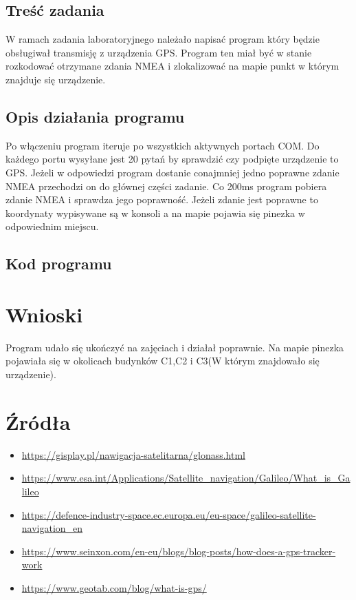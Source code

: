 \documentclass{article}
\begin{document}
    \subsection{Treść zadania}
    W ramach zadania laboratoryjnego należało napisać program który będzie obsługiwał transmisję z urządzenia GPS.
    Program ten miał być w stanie rozkodować otrzymane zdania NMEA i zlokalizować na mapie punkt w którym znajduje 
    się urządzenie.
    \subsection{Opis działania programu}
    Po włączeniu program iteruje po wszystkich aktywnych portach COM. Do każdego portu wysyłane jest 20 pytań by 
    sprawdzić czy podpięte urządzenie to GPS. Jeżeli w odpowiedzi program dostanie conajmniej jedno poprawne 
    zdanie NMEA przechodzi on do głównej części zadanie. Co 200ms program pobiera zdanie NMEA i sprawdza jego 
    poprawność. Jeżeli zdanie jest poprawne to koordynaty wypisywane są w konsoli a na mapie pojawia się pinezka
    w odpowiednim miejscu. 
    \subsection{Kod programu}
  \section{Wnioski}
  Program udało się ukończyć na zajęciach i działał poprawnie. Na mapie pinezka pojawiała się w okolicach budynków
  C1,C2 i C3(W którym znajdowało się urządzenie).
  \section{Źródła}
  \begin{itemize}
    
    \item \url{https://gisplay.pl/nawigacja-satelitarna/glonass.html}
    \item \url{https://www.esa.int/Applications/Satellite_navigation/Galileo/What_is_Galileo}
    \item \url{https://defence-industry-space.ec.europa.eu/eu-space/galileo-satellite-navigation_en}
    \item \url{https://www.seinxon.com/en-eu/blogs/blog-posts/how-does-a-gps-tracker-work}
    \item \url{https://www.geotab.com/blog/what-is-gps/}
  \end{itemize}
\end{document}
